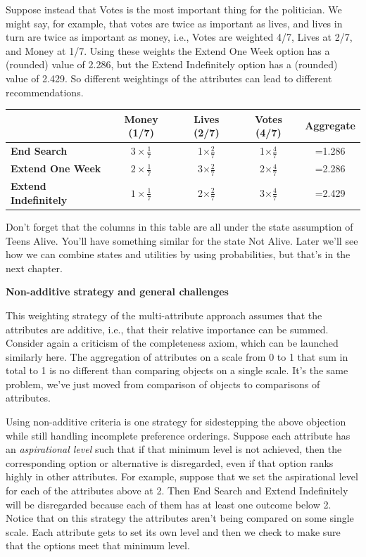 \documentclass[]{tufte-book}
\begin{document}
Suppose instead that Votes is the most important thing for the politician. We might say, for example, that votes are twice as important as lives, and lives in turn are twice as important as money, i.e., Votes are weighted 4/7, Lives at 2/7, and Money at 1/7. Using these weights the Extend One Week option has a (rounded) value of 2.286, but the Extend Indefinitely option has a (rounded) value of 2.429. So different weightings of the attributes can lead to different recommendations.

\begin{longtable}[]{@{}lcccc@{}}
\toprule
& Money (1/7) & Lives (2/7) & Votes (4/7) & Aggregate\tabularnewline
\midrule
\endhead
\textbf{End Search} & \(3\times \frac{1}{7}\) & 1\(\times \frac{2}{7}\) & 1\(\times \frac{4}{7}\) & =1.286\tabularnewline
\textbf{Extend One Week} & \(2\times \frac{1}{7}\) & 3\(\times \frac{2}{7}\) & 2\(\times \frac{4}{7}\) & =2.286\tabularnewline
\textbf{Extend Indefinitely} & \(1\times \frac{1}{7}\) & 2\(\times \frac{2}{7}\) & 3\(\times \frac{4}{7}\) & =2.429\tabularnewline
\bottomrule
\end{longtable}

Don't forget that the columns in this table are all under the state assumption of Teens Alive. You'll have something similar for the state Not Alive. Later we'll see how we can combine states and utilities by using probabilities, but that's in the next chapter.

\textbf{Non-additive strategy and general challenges}

This weighting strategy of the multi-attribute approach assumes that the attributes are additive, i.e., that their relative importance can be summed. Consider again a criticism of the completeness axiom, which can be launched similarly here. The aggregation of attributes on a scale from 0 to 1 that sum in total to 1 is no different than comparing objects on a single scale. It's the same problem, we've just moved from comparison of objects to comparisons of attributes.

Using non-additive criteria is one strategy for sidestepping the above objection while still handling incomplete preference orderings. Suppose each attribute has an \emph{aspirational level} such that if that minimum level is not achieved, then the corresponding option or alternative is disregarded, even if that option ranks highly in other attributes. For example, suppose that we set the aspirational level for each of the attributes above at 2. Then End Search and Extend Indefinitely will be disregarded because each of them has at least one outcome below 2. Notice that on this strategy the attributes aren't being compared on some single scale. Each attribute gets to set its own level and then we check to make sure that the options meet that minimum level.
\end{document}
